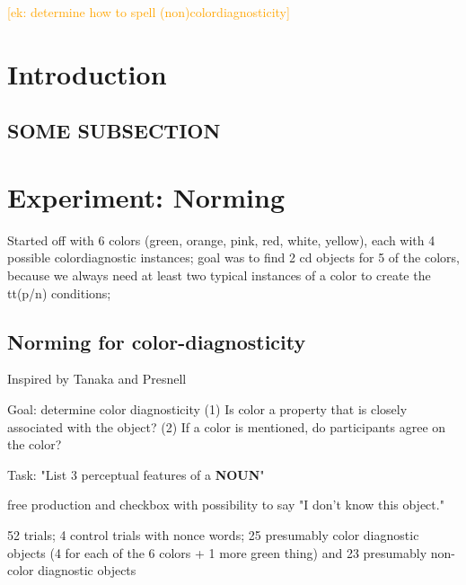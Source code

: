 \documentclass[a4paper,man,floatsintext,natbib,donotrepeattitle]{apa6}
\newcommand{\ek}[1]{\textcolor{Orange}{[ek: #1]}}
\begin{document}





\clearpage

\setcounter{page}{2}
\tableofcontents

\setcounter{secnumdepth}{3}

\clearpage

\ek{determine how to spell (non)colordiagnosticity}

\section{Introduction}
\setcounter{page}{1}

\subsection{SOME SUBSECTION}\label{sec:somesubsection}

\section{Experiment: Norming} \label{experiment}

Started off with 6 colors (green, orange, pink, red, white, yellow), each with 4 possible colordiagnostic instances; goal was to find 2 cd objects for 5 of the colors, because we always need at least two typical instances of a color to create the tt(p/n) conditions; 

\subsection{Norming for color-diagnosticity}

Inspired by Tanaka and Presnell

Goal: determine color diagnosticity
(1) Is color a property that is closely associated with the object?
(2) If a color is mentioned, do participants agree on the color?

Task: "List 3 perceptual features of a \textbf{NOUN}"

free production and checkbox with possibility to say "I don't know this object."

52 trials;
4 control trials with nonce words;
25 presumably color diagnostic objects (4 for each of the 6 colors + 1 more green thing) and 23 presumably non-color diagnostic objects
\end{document}
